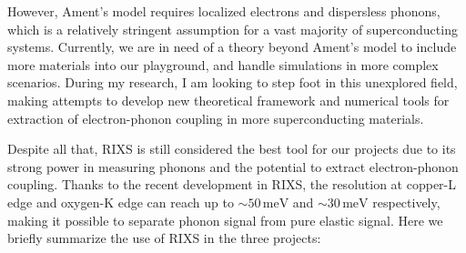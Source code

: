\documentclass[11pt]{article}
\begin{document}
However, Ament's model requires localized electrons and dispersless phonons, which is a relatively stringent assumption for a vast majority of superconducting systems. Currently, we are in need of a theory beyond Ament's model to include more materials into our playground, and handle simulations in more complex scenarios. During my research, I am looking to step foot in this unexplored field, making attempts to develop new theoretical framework and numerical tools for extraction of electron-phonon coupling in more superconducting materials.  


Despite all that, RIXS is still considered the best tool for our projects due to its strong power in measuring phonons and the potential to extract electron-phonon coupling. Thanks to the recent development in RIXS, the resolution at copper-L edge and oxygen-K edge can reach up to $\sim 50\,\mathrm{meV}$ and $\sim 30\,\mathrm{meV}$ respectively, making it possible to separate phonon signal from pure elastic signal. Here we briefly summarize the use of RIXS in the three projects:
\end{document}
